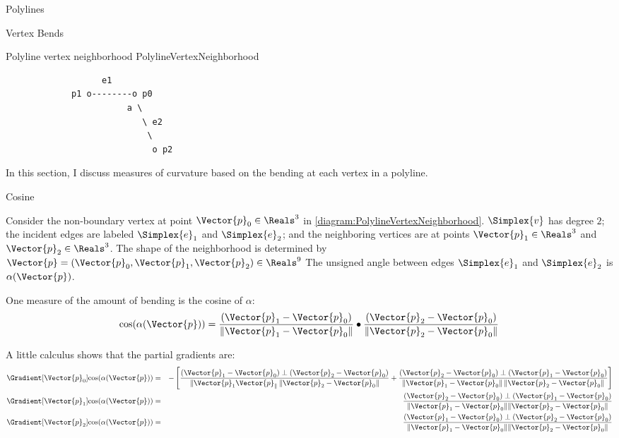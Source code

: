 \begin{plSection}{Polylines}
\begin{plSection}{Vertex Bends}
\label{sec:Vertex-Bends}

\begin{plDiagram}
{Polyline vertex neighborhood}
{PolylineVertexNeighborhood}
\centering
\begin{verbatim}
                   e1
             p1 o--------o p0
                        a \
                           \ e2
                            \
                             o p2
\end{verbatim}
\end{plDiagram}

In this section, I discuss measures of curvature
based on the bending at each vertex in a polyline.

\end{plSection}%
\begin{plSection}{Cosine}
\label{sec:polyline-vertex-cosine}

Consider the non-boundary vertex
at point $\Vector{p}_0 \in \Reals^3$ in 
\cref{diagram:PolylineVertexNeighborhood}.
$\Simplex{v}$ has degree $2$;
the incident edges are labeled 
$\Simplex{e}_1$ and $\Simplex{e}_2$;
and the neighboring vertices are at points $\Vector{p}_1 \in \Reals^3$
and $\Vector{p}_2 \in \Reals^3$.
The shape of the neighborhood is determined by
$\Vector{p} = (\Vector{p}_0, \Vector{p}_1, \Vector{p}_2) \in \Reals^9$
The unsigned angle between edges 
$\Simplex{e}_1$ and $\Simplex{e}_2$ is $\alpha(\Vector{p})$.

One measure of the amount of bending is the cosine of $\alpha$:
\begin{equation}
\cos(\alpha(\Vector{p})) =
\frac{(\Vector{p}_1-\Vector{p}_0)}{\|\Vector{p}_1-\Vector{p}_0\|} 
\bullet
\frac{(\Vector{p}_2-\Vector{p}_0)}{\|\Vector{p}_2-\Vector{p}_0\|}
\end{equation}

A little calculus shows that the partial gradients are:
\begin{eqnarray}
\label{eq:polyline-vertex-cosine-gradient}
\Gradient[\Vector{p}_0]{\cos(\alpha(\Vector{p}))}
& = &
-
\left[
\frac{
(\Vector{p}_1-\Vector{p}_0)\perp(\Vector{p}_2-\Vector{p}_0)}
{\|\Vector{p}_1 \Vector{p}_\|\,\|\Vector{p}_2-\Vector{p}_0\|}
+
\frac{
(\Vector{p}_2-\Vector{p}_0)\perp(\Vector{p}_1-\Vector{p}_0)}
{\|\Vector{p}_1-\Vector{p}_0\|\,\|\Vector{p}_2-\Vector{p}_0\|}
\right]
\\
\Gradient[\Vector{p}_1]{\cos(\alpha(\Vector{p}))}
& = &
\frac{
(\Vector{p}_2-\Vector{p}_0)\perp(\Vector{p}_1-\Vector{p}_0)}
{\|\Vector{p}_1-\Vector{p}_0\|\|\Vector{p}_2-\Vector{p}_0\|}
\nonumber
\\
\Gradient[\Vector{p}_2]{\cos(\alpha(\Vector{p}))}
& = &
\frac{
(\Vector{p}_1-\Vector{p}_0)\perp(\Vector{p}_2-\Vector{p}_0)}
{\|\Vector{p}_1-\Vector{p}_0\|\|\Vector{p}_2-\Vector{p}_0\|}
\nonumber
\end{eqnarray}


\end{plSection}
\end{plSection}

